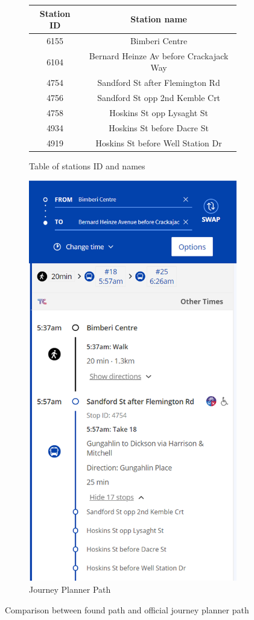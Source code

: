 \documentclass{article}
\begin{document}
\begin{figure}[h]
\centering
\begin{subfigure}{.5\textwidth}
  \centering
  \begin{tabular}{ |c|c| } 
 \hline
 Station ID & Station name \\ 
 \hline
 6155 & Bimberi Centre \\
 \hline
 6104 & Bernard Heinze Av before Crackajack Way \\
 \hline
 4754 & Sandford St after Flemington Rd \\
 \hline
 4756 & Sandford St opp 2nd Kemble Crt \\
 \hline
 4758 & Hoskins St opp Lysaght St \\
 \hline
 4934 & Hoskins St before Dacre St \\
 \hline
 4919 & Hoskins St before Well Station Dr \\
 \hline
\end{tabular}
  \caption{Table of stations ID and names}
\end{subfigure}%
\begin{subfigure}{.5\textwidth}
  \centering
  \includegraphics[width=.7\linewidth]{assets/JourneyPlanner}
  \caption{Journey Planner Path}
\end{subfigure}
\caption{Comparison between found path and official journey planner path}
\end{figure}
\end{document}
